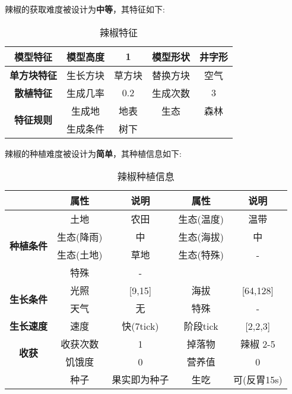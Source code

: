 辣椒的获取难度被设计为\textbf{中等}，其特征如下:
\begin{table}[H]
    \centering
    \caption{辣椒特征}
    \label{table:辣椒特征}
    \setlength{\tabcolsep}{4mm}
    \begin{tabular}{c|cc|cc}
        \toprule
        \textbf{模型特征}                  & 模型高度 & 1      & 模型形状 & 井字形 \\
        \midrule
        \textbf{单方块特征}                & 生长方块 & 草方块 & 替换方块 & 空气   \\
        \midrule
        \textbf{散植特征}                  & 生成几率 & 0.2    & 生成次数 & 3      \\
        \midrule
        \multirow{2}{*}{\textbf{特征规则}} & 生成地   & 地表   & 生态     & 森林   \\
                                           & 生成条件 & 树下                       \\
        \bottomrule
    \end{tabular}
\end{table}


辣椒的种植难度被设计为\textbf{简单}，其种植信息如下:

\begin{table}[H]
    \centering
    \caption{辣椒种植信息}
    \label{table:辣椒种植信息}
    \setlength{\tabcolsep}{4mm}
    \begin{tabular}{c|cc|cc}
        \toprule
                                           & \textbf{属性} & \textbf{说明} & \textbf{属性} & \textbf{说明} \\
        \midrule
        \multirow{4}{*}{\textbf{种植条件}} & 土地          & 农田          & 生态(温度)    & 温带          \\
                                           & 生态(降雨)    & 中            & 生态(海拔)    & 中            \\
                                           & 生态(土地)    & 草地          & 生态(特殊)    & -             \\
                                           & 特殊          & -                                             \\
        \midrule
        \multirow{2}{*}{\textbf{生长条件}} & 光照          & [9,15]        & 海拔          & [64,128]      \\
                                           & 天气          & 无            & 特殊          & -             \\
        \midrule
        \textbf{生长速度}                  & 速度          & 快(7tick)     & 阶段tick      & [2,2,3]       \\
        \midrule
        \multirow{2}{*}{\textbf{收获}}     & 收获次数      & 1             & 掉落物        & 辣椒 2-5      \\
                                           & 饥饿度        & 0             & 营养值        & 0             \\
                                           & 种子          & 果实即为种子  & 生吃          & 可(反胃15s)   \\
        \bottomrule
    \end{tabular}
\end{table}

\newpage